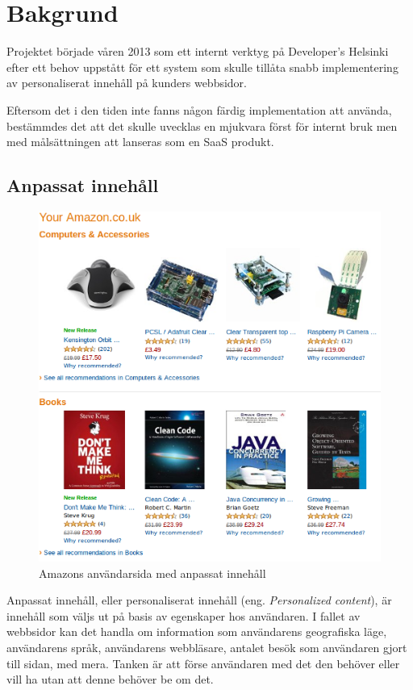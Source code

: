 \section{Bakgrund}

Projektet började våren 2013 som ett internt verktyg på Developer's Helsinki efter ett behov uppstått för ett system som skulle tillåta snabb implementering av personaliserat innehåll på kunders webbsidor.

Eftersom det i den tiden inte fanns någon färdig implementation att använda, bestämmdes det att det skulle uvecklas en mjukvara först för internt bruk men med målsättningen att lanseras som en SaaS produkt.

\subsection{Anpassat innehåll}

\begin{figure}[h!]
\centering
\includegraphics[width=120mm]{assets/images/amazon.png}
\caption{Amazons användarsida med anpassat innehåll}
\label{amazon}
\end{figure}

Anpassat innehåll, eller personaliserat innehåll (eng. \textit{Personalized content}), är innehåll som väljs ut på basis av egenskaper hos användaren. I fallet av webbsidor kan det handla om information som användarens geografiska läge, användarens språk, användarens webbläsare, antalet besök som användaren gjort till sidan, med mera. Tanken är att förse användaren med det den behöver eller vill ha utan att denne behöver be om det. \citep{cotacm43}

